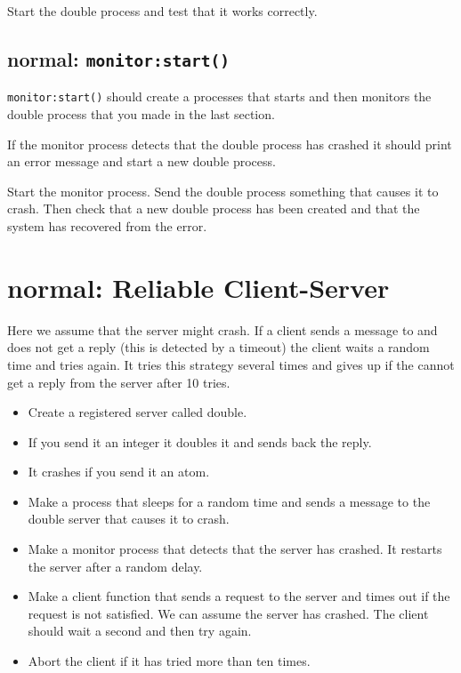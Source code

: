 \documentclass[12pt]{hitec}
\begin{document}
Start the double process and test that it works correctly.

\subsection{normal: \texttt{monitor:start()}}

\verb+monitor:start()+ should create a processes that starts and
then monitors the double process that you made in the last section.
 
If the monitor process detects that the double process has crashed
it should print an error message and start a new double process.

Start the monitor process. Send the double process something that causes it
to crash. Then check that a new double process has been created and that
the system has recovered from the error.

\section{normal: Reliable Client-Server}

Here we assume that the server might crash. If a client sends a message to
and does not get a reply (this is detected by a timeout) the client
waits a random time and tries again. It tries this strategy several times
and gives up if the cannot get a reply from the server after 10 tries. 

\begin{itemize}

\item Create a registered server called double.

\item If you send it an integer it doubles it and sends back the reply.

\item It crashes if you send it an atom.

\item Make a process that sleeps for a random time and sends a message
  to the double server that causes it to crash.

\item Make a monitor process that detects that the server has
  crashed. It restarts the server after a random delay.

\item Make a client function that sends a request to the server and
  times out if the request is not satisfied. We can assume the server
  has crashed. The client should wait a second and then try again.

\item  Abort the client if it has tried more than ten times.
\end{itemize}
\end{document}
